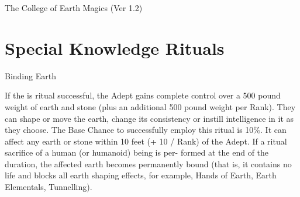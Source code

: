 \begin{Chapter}{The College of Earth Magics (Ver 1.2)}
\section{Special Knowledge Rituals}


\begin{ritual}[R-1]{Binding Earth}

\begin{effects}
If the is ritual successful, the Adept gains complete control over a
500 pound weight of earth and stone (plus an additional 500 pound
weight per Rank).  They can shape or move the earth, change its
consistency or instill intelligence in it as they choose.  The Base
Chance to successfully employ this ritual is 10\%.  It can affect any
earth or stone within 10 feet (+ 10 / Rank) of the Adept. If a ritual
sacrifice of a human (or humanoid) being is per- formed at the end of
the duration, the affected earth becomes permanently bound (that is,
it contains no life and blocks all earth shaping effects, for example,
Hands of Earth, Earth Elementals, Tunnelling).
\end{effects}
\end{ritual}

\end{Chapter}
